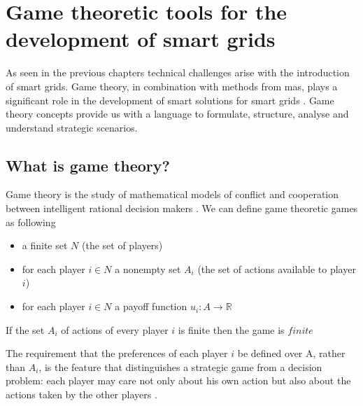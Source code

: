 \section{Game theoretic tools for the development of smart grids}


As seen in the previous chapters technical challenges arise with the introduction of smart grids. Game theory, in combination with methods from \ac{mas}, plays a significant role in the development of smart solutions for smart grids \cite{keypaper}. Game theory concepts provide us with a language to formulate, structure, analyse and understand strategic scenarios.

\subsection{What is game theory?}
Game theory is the study of mathematical models of conflict and cooperation between intelligent rational decision makers \cite{myerson2013game}.
We can define game theoretic games as following
\begin{itemize}
    \item a finite set $N$ (the set of players)
    \item for each player $i \in N$ a nonempty set $A_i$ (the set of actions available to player $i$)
    \item for each player $i \in N$ a payoff function $u_i: A \rightarrow \mathbb{R}$ 
\end{itemize}

If the set $A_i$ of actions of every player $i$ is finite then the game is $finite$

The requirement that the preferences of each player $i$ be defined over A, rather than $A_{i}$, is the feature that distinguishes a strategic game from a decision problem: each  player may care not only about his own action but also about the actions taken by the other players  \cite{CourseInGameTheory}.

